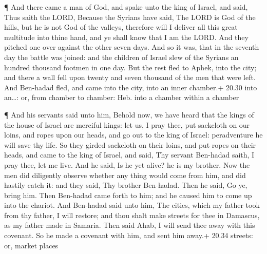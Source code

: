  ¶ And there came a man of God, and spake unto the king of
Israel, and said, Thus saith the LORD, Because the Syrians have said,
The LORD is God of the hills, but he is not God of the valleys,
therefore will I deliver all this great multitude into thine hand, and
ye shall know that I am the LORD.  And they pitched one
over against the other seven days. And so it was, that in the seventh
day the battle was joined: and the children of Israel slew of the
Syrians an hundred thousand footmen in one day.  But the
rest fled to Aphek, into the city; and there a wall fell upon twenty and
seven thousand of the men that were left. And Ben-hadad fled, and came
into the city, into an inner chamber.+ 20.30 into an\ldots: or, from
chamber to chamber: Heb. into a chamber within a chamber

 ¶ And his servants said unto him, Behold now, we have
heard that the kings of the house of Israel are merciful kings: let us,
I pray thee, put sackcloth on our loins, and ropes upon our heads, and
go out to the king of Israel: peradventure he will save thy life.
 So they girded sackcloth on their loins, and put ropes on
their heads, and came to the king of Israel, and said, Thy servant
Ben-hadad saith, I pray thee, let me live. And he said, Is he yet alive?
he is my brother.  Now the men did diligently observe
whether any thing would come from him, and did hastily catch it: and
they said, Thy brother Ben-hadad. Then he said, Go ye, bring him. Then
Ben-hadad came forth to him; and he caused him to come up into the
chariot.  And Ben-hadad said unto him, The cities, which my
father took from thy father, I will restore; and thou shalt make streets
for thee in Damascus, as my father made in Samaria. Then said Ahab, I
will send thee away with this covenant. So he made a covenant with him,
and sent him away.+ 20.34 streets: or, market places

